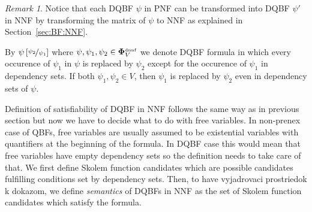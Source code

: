 \documentclass[
  digital, %
  twoside, %
  table,   %
  nolof,     %
  nolot,     %
]{fithesis3}
\theoremstyle{definition}
\theoremstyle{remark}
\newtheorem*{remark}{Remark}
\newcommand{\substitute}[2]{\left[ \nicefrac{#2}{#1} \right]}
\newcommand{\DQBF}[1]{\mathbf{\Phi}_{#1}^{\text{\tiny dnnf}}}
\begin{document}
\begin{remark}
Notice that each DQBF $\psi$ in PNF can be transformed into DQBF $\psi'$ in NNF by transforming the matrix of $\psi$ to NNF as explained in Section~\ref{sec:BF:NNF}.
\end{remark}

By $\psi\substitute{\psi_1}{\psi_2}$ where $\psi, \psi_1, \psi_2 \in \DQBF{V}$ we denote DQBF formula in which every occurence of $\psi_1$ in $\psi$ is replaced by $\psi_2$ except for the occurence of $\psi_1$ in dependency sets. If both $\psi_1, \psi_2 \in V$, then $\psi_1$ is replaced by $\psi_2$ even in dependency sets of $\psi$.

Definition of satisfiability of DQBF in NNF follows the same way as in previous section but now we have to decide what to do with free variables. In non-prenex case of QBFs, free variables are usually assumed to be existential variables with quantifiers at the beginning of the formula. In DQBF case this would mean that free variables have empty dependency sets so the definition needs to take care of that. We first define Skolem function candidates which are possible candidates fulfilling conditions set by dependency sets. Then, to have vyjadrovaci prostriedok k dokazom, we define \emph{semantics} of DQBFs in NNF as the set of Skolem function candidates which satisfy the formula.%
\end{document}
